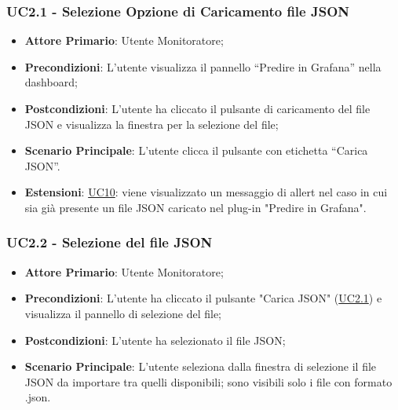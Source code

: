 		\label{par:UC2.1}
		\subsubsection{UC2.1 - Selezione Opzione di Caricamento file JSON}
		\begin{itemize}
			\item\textbf{Attore Primario}: Utente Monitoratore;
			\item\textbf{Precondizioni}: L’utente visualizza il pannello “Predire in Grafana” nella dashboard;
			\item\textbf{Postcondizioni}: L’utente ha cliccato il pulsante di caricamento del file JSON e visualizza la finestra per la selezione del file;
			\item\textbf{Scenario Principale}: L’utente clicca il pulsante con etichetta  “Carica JSON”.
			\item\textbf{Estensioni}: \hyperref[par:UC10]{UC10}: viene visualizzato un messaggio di allert nel caso in cui sia già presente un file JSON caricato nel plug-in "Predire in Grafana".
		\end{itemize}		
		
		\label{par:UC2.2}
		\subsubsection{UC2.2 - Selezione del file JSON}
		\begin{itemize}
			\item\textbf{Attore Primario}: Utente Monitoratore;
			\item\textbf{Precondizioni}: L’utente ha cliccato il pulsante "Carica JSON" (\hyperref[par:UC2.1]{UC2.1}) e visualizza il pannello di selezione del file;
			\item\textbf{Postcondizioni}: L’utente ha selezionato il file JSON;
			\item\textbf{Scenario Principale}: L’utente seleziona dalla finestra di selezione il file JSON da importare tra quelli disponibili; sono visibili solo i file con formato .json.
		\end{itemize}
		
		\label{par:UC2.3}
